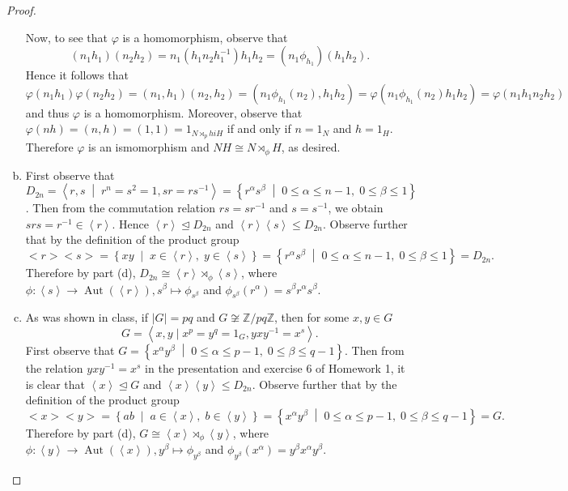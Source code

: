 \documentclass[10pt]{amsart}
\newcommand{\Aut}[1]{\operatorname{Aut}\left(#1\right)}
\newcommand{\abs}[1]{\left| #1 \right|}
\begin{document}
\begin{thm}
\begin{proof}
\begin{enumerate}[(a)]
		Now, to see that $\varphi$ is a homomorphism, observe that 
		$$(n_1h_1)(n_2h_2) = n_1(h_1n_2h_1^{-1})h_1h_2 = (n_1\phi_{h_1})(h_1h_2).$$
		Hence it follows that
		$$\varphi(n_1h_1)\varphi(n_2h_2) = (n_1, h_1)(n_2,h_2) = (n_1\phi_{h_1}(n_2), h_1h_2) = \varphi(n_1\phi_{h_1}(n_2)h_1h_2) = \varphi(n_1h_1n_2h_2)$$
		and thus $\varphi$ is a homomorphism.
		Moreover, observe that $\varphi(nh) = (n,h) = (1,1) = 1_{N \rtimes_phi H}$ if and only if $n = 1_N$ and $h = 1_H$.
		Therefore $\varphi$ is an ismomorphism and $NH \cong N \rtimes_{\phi} H$, as desired.
    \item
		First observe that $D_{2n} = \left< r, s \;\middle\vert\; r^n = s^2 = 1, sr = rs^{-1}\right> = \left\{r^\alpha s^\beta \;\middle\vert\; 0 \leq \alpha \leq n-1,\; 0 \leq \beta \leq 1\right\}$.
		Then from the commutation relation $rs = sr^{-1}$ and $s = s^{-1}$, we obtain $srs = r^{-1} \in \left<r\right>$.
		Hence $\left<r\right> \unlhd D_{2n}$ and $\left<r\right>\left<s\right> \leq D_{2n}$.
		Observe further that by the definition of the product group
		$$<r><s> = \left\{xy \;\middle\vert\; x \in \left<r\right>,\; y \in \left<s\right>\right\} = \left\{r^\alpha s^\beta \;\middle\vert\; 0 \leq \alpha \leq n-1,\; 0 \leq \beta \leq 1\right\} = D_{2n}.$$ 
		Therefore by part (d), $D_{2n} \cong \left<r\right> \rtimes_{\phi} \left<s\right>$, where $\phi \colon \left<s\right> \rightarrow \Aut{\left<r\right>}, s^\beta \mapsto \phi_{s^\beta}$ and $\phi_{s^\beta}(r^\alpha) = s^\beta r^\alpha s^\beta$.
    \item
		As was shown in class, if $\abs{G} = pq$ and $G \not \cong \mathbb{Z}/pq\mathbb{Z}$, then for some $x,y \in G$
			$$G = \left< x, y \mid x^p = y^q = 1_G, yxy^{-1} = x^s\right>.$$
		First observe that $G = \left\{x^\alpha y^\beta \;\middle\vert\; 0 \leq \alpha \leq p-1,\; 0 \leq \beta \leq q-1\right\}$.
		Then from the relation $yxy^{-1} = x^s$ in the presentation and exercise 6 of Homework 1, it is clear that $\left<x\right> \unlhd G$ and $\left<x\right>\left<y\right> \leq D_{2n}$.
		Observe further that by the definition of the product group
		$$<x><y> = \left\{ab \;\middle\vert\; a \in \left<x\right>,\; b \in \left<y\right>\right\} = \left\{x^\alpha y^\beta \;\middle\vert\; 0 \leq \alpha \leq p-1,\; 0 \leq \beta \leq q-1\right\} = G.$$ 
		Therefore by part (d), $G \cong \left<x\right> \rtimes_{\phi} \left<y\right>$, where $\phi \colon \left<y\right> \rightarrow \Aut{\left<x\right>}, y^\beta \mapsto \phi_{y^\beta}$ and $\phi_{y^\beta}(x^\alpha) = y^\beta x^\alpha y^\beta$.
    \end{enumerate}
  \end{proof}
\end{thm}
\end{document}
